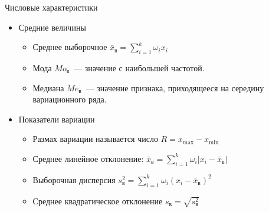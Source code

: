 \documentclass[unicode,11pt,notheorems,xcolor=table]{beamer}
\begin{document}
\begin{frame}{Числовые характеристики}{}
    
    \begin{itemize}
        \item Средние величины
        \begin{itemize}
            \item Среднее выборочное $\displaystyle \bar{x}_\text{в} = \sum_{i=1}^k \omega_i x_i$
            \item Мода $Mo_\text{в}$~--- значение с наибольшей частотой.
            \item Медиана $Me_\text{в}$~--- значение признака, приходящееся на середину вариационного ряда. 
        \end{itemize}
        
        \vfill
        \item Показатели вариации
        \begin{itemize}
            \item Размах вариации называется число $R=x_{\max}-x_{\min}$
            \item Среднее линейное отклонение: $\displaystyle \bar{x}_\text{в} = \sum_{i=1}^k \omega_i | x_i-\bar{x}_\text{в} |$
            \item Выборочная дисперсия $\displaystyle s^2_\text{в} = \sum_{i=1}^k \omega_i (x_i-\bar{x}_\text{в} )^2$
            \item Среднее квадратическое отклонение 
            $\displaystyle  s_\text{в}= \sqrt{s^2_\text{в}}$
        \end{itemize}
    \end{itemize}
\end{frame}
\end{document}
